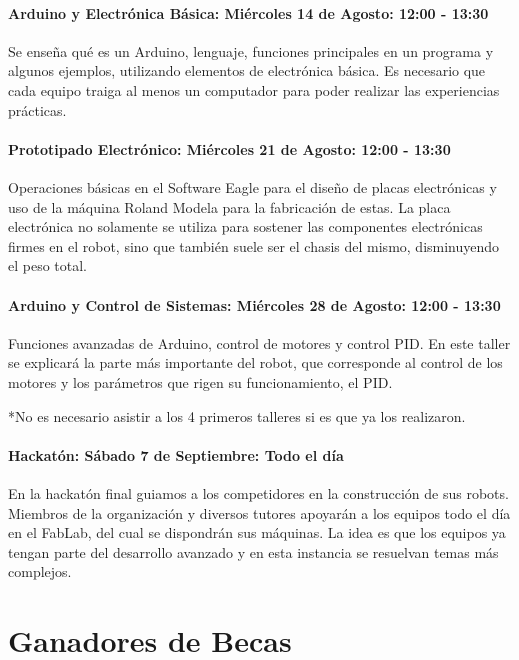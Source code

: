 {\paragraph*{Arduino y Electrónica Básica: Miércoles 14 de Agosto: 12:00 - 13:30}

Se enseña qué es un Arduino, lenguaje, funciones principales en un programa y algunos ejemplos, utilizando elementos de electrónica básica.
Es necesario que cada equipo traiga al menos un computador para poder realizar las experiencias prácticas.

\paragraph*{Prototipado Electrónico: Miércoles 21 de Agosto: 12:00 - 13:30}

Operaciones básicas en el Software Eagle para el diseño de placas electrónicas y uso de la máquina Roland Modela para la fabricación de estas. La placa electrónica no solamente se utiliza para sostener las componentes electrónicas firmes en el robot, sino que también suele ser el chasis del mismo, disminuyendo el peso total.

\paragraph*{Arduino y Control de Sistemas: Miércoles 28 de Agosto: 12:00 - 13:30}

Funciones avanzadas de Arduino, control de motores y control PID. En este taller se explicará la parte más importante del robot, que corresponde al control de los motores y los parámetros que rigen su funcionamiento, el PID.

*No es necesario asistir a los 4 primeros talleres si es que ya los realizaron. 

\paragraph*{Hackatón: Sábado 7 de Septiembre: Todo el día}
En la hackatón final guiamos a los competidores en la construcción de sus robots.
Miembros de la organización y diversos tutores apoyarán a los equipos todo el día en el FabLab, del cual se dispondrán sus máquinas.
La idea es que los equipos ya tengan parte del desarrollo avanzado y en esta instancia se resuelvan temas más complejos.

\section{Ganadores de Becas}

}
